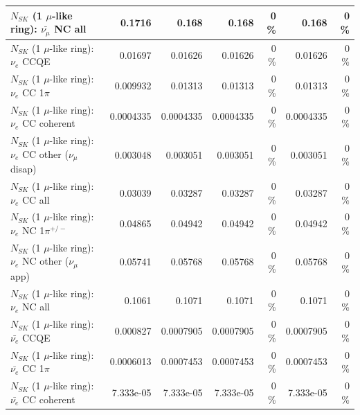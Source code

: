 \begin{table}
\begin{tabular}{| l | r | r | r  r | r  r |}
                          $N_{SK}$ (1 $\mu$-like ring): $\bar{\nu_{\mu}}$ NC all &          0.1716 &           0.168 &           0.168 &        0 \%  &           0.168 &        0 \%  \\ 
\hline
\hline
\hline
                                      $N_{SK}$ (1 $\mu$-like ring): $\nu_e$ CCQE &         0.01697 &         0.01626 &         0.01626 &        0 \%  &         0.01626 &        0 \%  \\ 
                                 $N_{SK}$ (1 $\mu$-like ring): $\nu_e$ CC 1$\pi$ &        0.009932 &         0.01313 &         0.01313 &        0 \%  &         0.01313 &        0 \%  \\ 
                               $N_{SK}$ (1 $\mu$-like ring): $\nu_e$ CC coherent &       0.0004335 &       0.0004335 &       0.0004335 &        0 \%  &       0.0004335 &        0 \%  \\ 
                $N_{SK}$ (1 $\mu$-like ring): $\nu_e$ CC other ($\nu_\mu$ disap) &        0.003048 &        0.003051 &        0.003051 &        0 \%  &        0.003051 &        0 \%  \\ 
                                  $N_{SK}$ (1 $\mu$-like ring): $\nu_{e}$ CC all &         0.03039 &         0.03287 &         0.03287 &        0 \%  &         0.03287 &        0 \%  \\ 
\hline
                           $N_{SK}$ (1 $\mu$-like ring): $\nu_e$ NC 1$\pi^{+/-}$ &         0.04865 &         0.04942 &         0.04942 &        0 \%  &         0.04942 &        0 \%  \\ 
                  $N_{SK}$ (1 $\mu$-like ring): $\nu_e$ NC other ($\nu_\mu$ app) &         0.05741 &         0.05768 &         0.05768 &        0 \%  &         0.05768 &        0 \%  \\ 
                                  $N_{SK}$ (1 $\mu$-like ring): $\nu_{e}$ NC all &          0.1061 &          0.1071 &          0.1071 &        0 \%  &          0.1071 &        0 \%  \\ 
\hline
\hline
\hline
                                $N_{SK}$ (1 $\mu$-like ring): $\bar{\nu_e}$ CCQE &        0.000827 &       0.0007905 &       0.0007905 &        0 \%  &       0.0007905 &        0 \%  \\ 
                           $N_{SK}$ (1 $\mu$-like ring): $\bar{\nu_e}$ CC 1$\pi$ &       0.0006013 &       0.0007453 &       0.0007453 &        0 \%  &       0.0007453 &        0 \%  \\ 
                         $N_{SK}$ (1 $\mu$-like ring): $\bar{\nu_e}$ CC coherent &       7.333e-05 &       7.333e-05 &       7.333e-05 &        0 \%  &       7.333e-05 &        0 \%  \\ 

\end{tabular}
\end{table}
